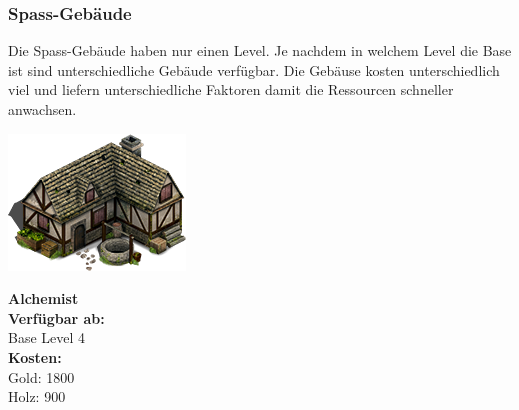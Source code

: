 \documentclass{scrartcl}
\newcommand{\n}{\newline}
\begin{document}
\subsubsection{Spass-Gebäude}
Die Spass-Gebäude haben nur einen Level. Je nachdem in welchem Level die Base ist sind unterschiedliche Gebäude verfügbar. Die Gebäuse kosten unterschiedlich viel und liefern unterschiedliche Faktoren damit die Ressourcen schneller anwachsen.\n
\n
\begin{minipage}{0.3\textwidth}
	\includegraphics[width=\textwidth]{imgAlchemist.png}
\end{minipage}
\hfill
\begin{minipage}{0.5\textwidth}
	\textbf{Alchemist}\\

	\textbf{Verfügbar ab: }\\ Base Level 4\\
	\textbf{Kosten:
	}\\
	Gold: 1800 \\
	Holz: 900\\
	
\end{minipage}
\end{document}

